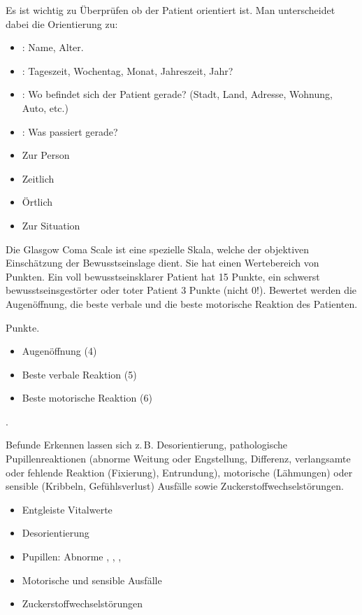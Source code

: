 {%
\label{topic:orientierung}
%
Es ist wichtig zu Überprüfen ob der Patient orientiert ist.
Man unterscheidet dabei die Orientierung zu:  
\begin{itemize}
  \item {}: Name, Alter.
  \item {}: Tageszeit,
  Wochentag, Monat, Jahreszeit, Jahr?
  \item {}: Wo befindet sich der Patient gerade?
  \newline
  (Stadt, Land, Adresse, Wohnung, Auto, etc.)
  \item {}: Was passiert gerade?
\end{itemize}

}{
\begin{itemize}
    \item Zur Person
    \item Zeitlich
    \item Örtlich
    \item Zur Situation
\end{itemize}
}{}{}{}



{%
\label{topic:gcs}
%
Die Glasgow Coma Scale ist eine spezielle Skala, welche der
objektiven Einschätzung der Bewusstseinslage  dient. Sie
hat einen Wertebereich von  Punkten. Ein voll
bewusstseinsklarer Patient hat 15 Punkte, ein schwerst
bewusstseinsgestörter oder toter Patient 3 Punkte (nicht
0!). Bewertet werden die Augenöffnung, die beste verbale und
die beste motorische Reaktion des
Patienten.
}{
 Punkte.
\begin{itemize}
    \item Augenöffnung (4)
    \item Beste verbale Reaktion (5)
    \item Beste motorische Reaktion (6)
\end{itemize}
.
}{}{}{}

\TextSlide
{{\eye} Befunde}
{Erkennen lassen sich z.\,B.  Desorientierung, pathologische
Pupillenreaktionen (abnorme Weitung oder Engstellung,
Differenz, verlangsamte oder fehlende Reaktion (Fixierung),
Entrundung), motorische (Lähmungen) oder sensible (Kribbeln,
Gefühlsverlust) Ausfälle sowie Zuckerstoffwechselstörungen.
}
{
\begin{itemize}
  \item Entgleiste Vitalwerte
  \item Desorientierung
  \item Pupillen: Abnorme , ,
  , 
  \item Motorische und sensible Ausfälle
  \item Zuckerstoffwechselstörungen
\end{itemize}
}
{}
{}
{}

